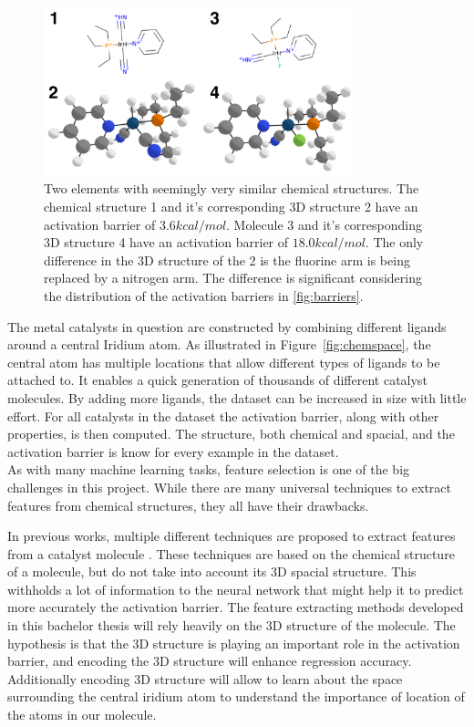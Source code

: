 \begin{figure}
  \centering
  \includegraphics[width=0.8\textwidth]{figures/introduction/elems_intro.png}
  \caption[Example of catalyst molecules]{Two elements with seemingly very similar chemical structures. The chemical structure 1 and it's corresponding 3D structure 2 have an activation barrier of $3.6 kcal/mol$.
  Molecule 3 and it's corresponding 3D structure 4 have an activation barrier of $18.0 kcal/mol$.
  The only difference in the 3D structure of the 2 is the fluorine arm is being replaced by a nitrogen arm.
  The difference is significant considering the distribution of the activation barriers in \ref{fig:barriers}.  }
  \label{fig:struct-diff}
\end{figure}


The metal catalysts in question are constructed by combining different ligands around a central Iridium atom.
As illustrated in Figure~\ref{fig:chemspace}, the central atom has multiple locations that allow different types of ligands to be attached to.  
It enables a quick generation of thousands of different catalyst molecules.
By adding more ligands, the dataset can be increased in size with little effort.
For all catalysts in the dataset the activation barrier, along with other properties, is then computed.
The structure, both chemical and spacial, and the activation barrier is know for every example in the dataset. 
\\
As with many machine learning tasks, feature selection is one of the big challenges in this project.
While there are many universal techniques to extract features from chemical structures, they all have their drawbacks.

In previous works, multiple different techniques are proposed to extract features from a catalyst molecule \cite{friederich_dos}.
These techniques are based on the chemical structure of a molecule, but do not take into account its 3D spacial structure.
This withholds a lot of information to the neural network that might help it to predict more accurately the activation barrier.
The feature extracting methods developed in this bachelor thesis will rely heavily on the 3D structure of the molecule.
The hypothesis is that the 3D structure is playing an important role in the activation barrier, and encoding the 3D structure will enhance regression accuracy.
Additionally encoding 3D structure will allow to learn about the space surrounding the central 
iridium atom to understand the importance of location of the atoms in our molecule.

